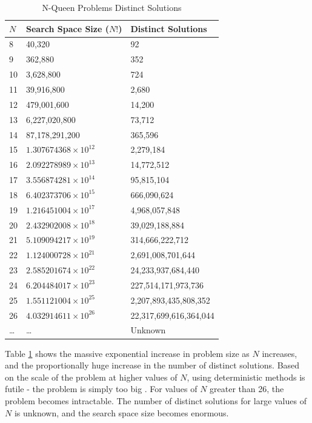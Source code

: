 \documentclass[conference]{IEEEtran}
\begin{document}
\begin{table}[h!]
\centering
\caption{N-Queen Problems Distinct Solutions}
\begin{tabular}{|l|l|l|} \hline
$N$  & Search Space Size ($N!$)      & Distinct Solutions     \\ \hline
8  & 40,320                     & 92                     \\
9  & 362,880                    & 352                    \\
10 & 3,628,800                  & 724                    \\
11 & 39,916,800                 & 2,680                  \\
12 & 479,001,600                & 14,200                 \\
13 & 6,227,020,800              & 73,712                 \\
14 & 87,178,291,200             & 365,596                \\
15 & $1.307674368\times10^{12}$ & 2,279,184              \\
16 & $2.092278989\times10^{13}$ & 14,772,512             \\
17 & $3.556874281\times10^{14}$ & 95,815,104             \\
18 & $6.402373706\times10^{15}$ & 666,090,624            \\
19 & $1.216451004\times10^{17}$ & 4,968,057,848          \\
20 & $2.432902008\times10^{18}$ & 39,029,188,884         \\
21 & $5.109094217\times10^{19}$ & 314,666,222,712        \\
22 & $1.124000728\times10^{21}$ & 2,691,008,701,644      \\
23 & $2.585201674\times10^{22}$ & 24,233,937,684,440     \\
24 & $6.204484017\times10^{23}$ & 227,514,171,973,736    \\
25 & $1.551121004\times10^{25}$ & 2,207,893,435,808,352  \\
26 & $4.032914611\times10^{26}$ & 22,317,699,616,364,044 \\
\dots & \dots & Unknown				\\
\hline\end{tabular}
\label{table:probgrowth}
\end{table}

Table \ref{table:probgrowth} shows the massive exponential increase in problem size as $N$ increases, and the proportionally huge increase in the number of distinct solutions. Based on the scale of the problem at higher values of $N$, using deterministic methods is futile - the problem is simply too big \cite{cit:20}. For values of $N$ greater than 26, the problem becomes intractable. The number of distinct solutions for large values of $N$ is unknown, and the search space size becomes enormous. 
\end{document}
